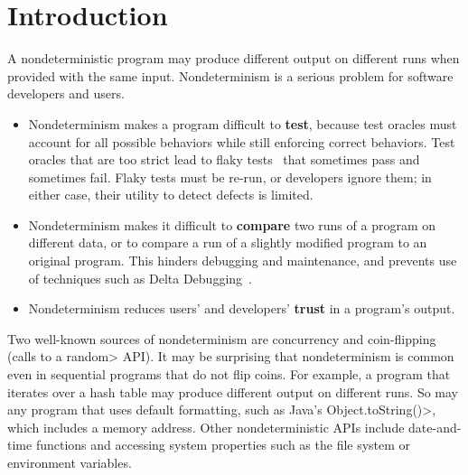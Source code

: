 \section{Introduction}

A nondeterministic program may produce different output on different runs
when provided with the same input.
Nondeterminism is a serious problem for software developers and users.
\begin{itemize}
\item
  Nondeterminism makes a program difficult to \textbf{test}, because test
  oracles must account for all possible behaviors while still enforcing
  correct behaviors.  Test oracles that are too strict lead to flaky
  tests~\cite{LuoHEM2014,nondex,deflaker,Rahman:2018:IFF:3236024.3275529,LuoHEM2014,Sudarshan}
  that sometimes pass and sometimes fail.  Flaky tests must be re-run, or
  developers ignore them; in either case, their utility to detect defects
  is limited.
\item
  Nondeterminism makes it difficult to \textbf{compare} two runs of a
  program on different data, or to compare a run of a slightly modified
  program to an original program.  This hinders debugging and maintenance,
  and prevents use of techniques such as Delta Debugging~\cite{Zeller1999,YuLCZ2012}.
\item
  Nondeterminism reduces users' and developers' \textbf{trust} in a program's output.
\end{itemize}

Two well-known sources of nondeterminism are concurrency
and coin-flipping
(calls to a \<random> API\@).
It may be surprising that nondeterminism is common even in sequential
programs that do not flip coins.
For example, a program that iterates over a hash table
may produce different output on different runs.
So may any program that uses default formatting, such as Java's
\<Object.toString()>, which includes a memory address.
Other nondeterministic APIs include date-and-time functions and
accessing system properties such as the file system or environment variables.

